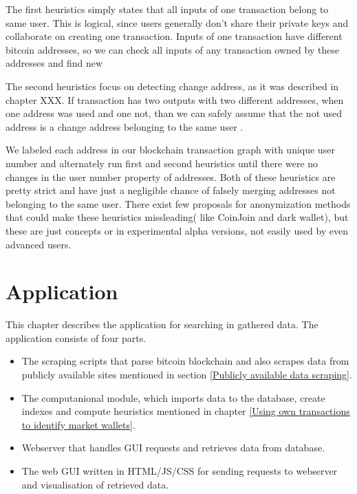 \documentclass[
  digital, %
  table,   %
  lof,     %
  lot,     %
  oneside
]{fithesis3}
\begin{document}
The first heuristics simply states that all inputs of one transaction belong to same user. This is logical,
since users generally don't share their private keys and collaborate on creating one transaction.
Inputs of one transaction have different bitcoin addresses, so we can check all inputs of any transaction
owned by these addresses and find new 

The second heuristics focus on detecting change address, as it was described in chapter XXX.
If transaction has two outputs with two different addresses, when one address was used and one not,
than we can safely assume that the not used address is a change address belonging to the same user \parencite{androulaki2013evaluating}.

We labeled each address in our blockchain transaction graph with unique user number
and alternately run first and second heuristics until there were no changes in the user number property of addresses.
Both of these heuristics are pretty strict and have just a negligible chance of falsely merging
addresses not belonging to the same user\parencite{androulaki2013evaluating}.
There exist few proposals for anonymization methods that could make
these heuristics missleading( like CoinJoin and dark wallet), but
these are just concepts or in experimental alpha versions, not easily
used by even advanced users.

\chapter{Application}

This chapter describes the application for searching in gathered data.
The application consists of four parts.

\begin{itemize}
 \item The scraping scripts that parse bitcoin blockchain and also scrapes data from publicly available sites mentioned in section \ref{Publicly available data scraping}.
 \item The computanional module, which imports data to the database, create indexes and compute heuristics mentioned in chapter \ref{Using own transactions to identify market wallets}.
 \item Webserver that handles GUI requests and retrieves data from database.
 \item The web GUI written in HTML/JS/CSS for sending requests to webserver and visualisation of retrieved data. 
\end{itemize}
\end{document}
